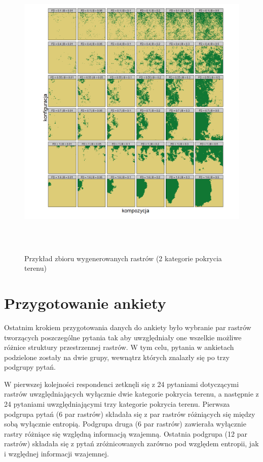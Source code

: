 \documentclass{amuthesis}
\begin{document}
\begin{figure}[t]

{\centering \includegraphics[width=1\textwidth,height=5.72917in]{figures/wykres1_2classes.png}

}

\caption{\label{fig-wykres1_2classes}Przykład zbioru wygenerowanych
rastrów (2 kategorie pokrycia terenu)}

\end{figure}

\hypertarget{sec-przygotowanie1}{%
\section{Przygotowanie ankiety}\label{sec-przygotowanie1}}

Ostatnim krokiem przygotowania danych do ankiety było wybranie par
rastrów tworzących poszczególne pytania tak aby uwzględniały one
wszelkie możliwe różnice struktury przestrzennej rastrów. W tym celu,
pytania w ankietach podzielone zostały na dwie grupy, wewnątrz których
znalazły się po trzy podgrupy pytań.

W pierwszej kolejności respondenci zetknęli się z 24 pytaniami
dotyczącymi rastrów uwzględniających wyłącznie dwie kategorie pokrycia
terenu, a następnie z 24 pytaniami uwzględniającymi trzy kategorie
pokrycia terenu. Pierwsza podgrupa pytań (6 par rastrów) składała się z
par rastrów różniących się między sobą wyłącznie entropią. Podgrupa
druga (6 par rastrów) zawierała wyłącznie rastry różniące się względną
informacją wzajemną. Ostatnia podgrupa (12 par rastrów) składała się z
pytań zróżnicowanych zarówno pod względem entropii, jak i względnej
informacji wzajemnej.
\end{document}
